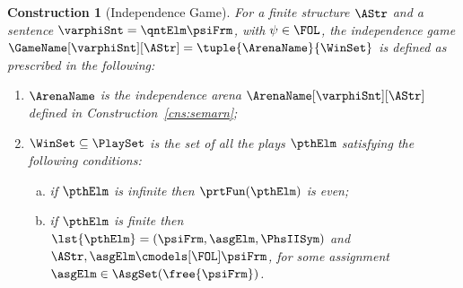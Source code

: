 \documentclass[authoryear]{elsarticle}
\newtheorem{construction}{Construction}
\begin{document}
\begin{construction}[Independence Game]
  \label{cns:semgam}
  For a finite structure $\AStr$ and a \pnf \ADIF sentence $\varphiSnt = \qntElm
  \psiFrm$, with $\psi \in \FOL$, the \emph{independence game}
  $\GameName[\varphiSnt][\AStr] = \tuple {\ArenaName} {\WinSet}$ is defined as
  prescribed in the following:
  \begin{enumerate}[1)]
    \item\label{cns:semgam(arn)}
      $\ArenaName$ is the independence arena $\ArenaName[\varphiSnt][\AStr]$
      defined in Construction~\ref{cns:semarn};
    \item\label{cns:semgam(win)}
      $\WinSet \subseteq \PlaySet$ is the set of all the plays $\pthElm$
      satisfying the following conditions:
      \begin{enumerate}[a)]
        \item\label{cns:semgam(win:inf)}
          if $\pthElm$ is infinite then $\prtFun(\pthElm)$ is even;
        \item\label{cns:semgam(win:fin)}
          if $\pthElm$ is finite then $\lst{\pthElm} = (\psiFrm, \asgElm,
          \PhsIISym)$ and $\AStr, \asgElm \cmodels[\FOL] \psiFrm$, for some
          assignment $\asgElm \in \AsgSet(\free{\psiFrm})$.
      \end{enumerate}
  \end{enumerate}
\end{construction}
\end{document}

